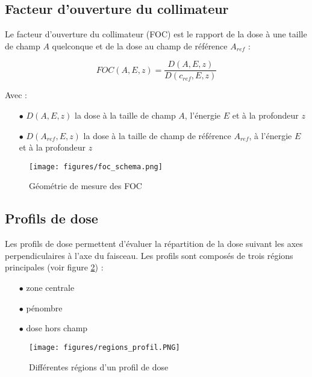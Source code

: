 \documentclass{article}
\begin{document}
\subsection{Facteur d'ouverture du collimateur}

Le facteur d'ouverture du collimateur (FOC) est le rapport de la dose à une taille de champ $A$ quelconque et de la dose au champ de référence $A_{ref}$ :

\begin{equation}
    FOC(A, E, z) = \dfrac{D(A, E, z)}{D(c_{ref}, E, z)}
    \label{eq_foc}
\end{equation}

Avec :

\begin{itemize}
    \item[$\bullet$] $D(A, E, z)$ la dose à la taille de champ $A$, l'énergie $E$ et à la profondeur $z$
    \item[$\bullet$] $D(A_{ref}, E, z)$ la dose à la taille de champ de référence $A_{ref}$, à l'énergie $E$ et à la profondeur $z$
\end{itemize}

\begin{figure}[h]
  \centering
  \texttt{[image: figures/foc\_schema.png]}
  \caption{Géométrie de mesure des FOC \cite{mayles2007handbook}}
  \label{fig_foc}
\end{figure}

\newpage
\subsection{Profils de dose}

Les profils de dose permettent d'évaluer la répartition de la dose suivant les axes perpendiculaires à l'axe du faisceau. Les profils sont composés de trois régions principales (voir figure \ref*{fig_regions_profil}) :

\begin{itemize}
  \item[$\bullet$] zone centrale
  \item[$\bullet$] pénombre
  \item[$\bullet$] dose hors champ
\end{itemize}

\begin{figure}[h]
  \centering
  \texttt{[image: figures/regions\_profil.PNG]}
  \caption{Différentes régions d'un profil de dose}
  \label{fig_regions_profil}
\end{figure}
\end{document}

